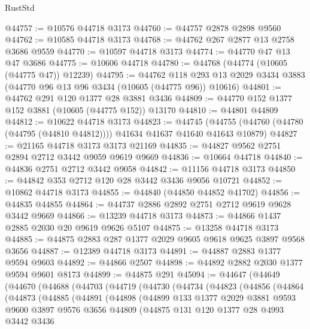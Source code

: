 \begin{lexlean}{RustStd}
\begin{coremodule}
@44757 := @10576 @44718 @3173
@44760 := @44757 @2878 @2898 @9560
@44762 := @10585 @44718 @3173
@44768 := @44762 @267 @2877 @13 @2758 @3686 @9559
@44770 := @10597 @44718 @3173
@44774 := @44770 @47 @13 @47 @3686
@44775 := @10606 @44718
@44780 := @44768 (@44774 (@10605 (@44775 @47)) @12239)
@44795 := @44762
    @118
    @293
    @13
    @2029
    @3434
    @3883
    (@44770 @96 @13 @96 @3434 (@10605 (@44775 @96)) @10616)
@44801 := @44762 @291 @120 @1377 @28 @3881 @3436
@44809 := @44770 @152 @1377 @152 @3881 (@10605 (@44775 @152)) @13170
@44810 := @44801 @44809
@44812 := @10622 @44718 @3173
@44823 := @44745
    (@44755 (@44760 (@44780 (@44795 (@44810 @44812)))) @41634 @41637 @41640 @41643 @10879)
@44827 := @21165 @44718 @3173 @3173 @21169
@44835 := @44827 @9562 @2751 @2894 @2712 @3442 @9059 @9619 @9669
@44836 := @10664 @44718
@44840 := @44836 @2751 @2712 @3442 @9058
@44842 := @11156 @44718 @3173
@44850 := @44842 @353 @2712 @120 @28 @3442 @3436 @9056 @10721
@44852 := @10862 @44718 @3173
@44855 := @44840 (@44850 @44852 @41702)
@44856 := @44835 @44855
@44864 := @44737 @2886 @2892 @2751 @2712 @9619 @9628 @3442 @9669
@44866 := @13239 @44718 @3173
@44873 := @44866 @1437 @2885 @2030 @20 @9619 @9626 @5107
@44875 := @13258 @44718 @3173
@44885 := @44875 @2883 @287 @1377 @2029 @9605 @9618 @9625 @3897 @9568 @3656
@44887 := @12389 @44718 @3173
@44891 := @44887 @2883 @1377 @9594 @9603
@44892 := @44866 @2507
@44898 := @44892 @2882 @2030 @1377 @9594 @9601 @8173
@44899 := @44875 @291
@45094 := @44647
    (@44649
      (@44670
        (@44688
          (@44703
            (@44719
              (@44730
                (@44734
                  (@44823
                    (@44856
                      (@44864
                        (@44873
                          (@44885
                            (@44891
                              (@44898
                                (@44899
                                  @133
                                  @1377
                                  @2029
                                  @3881
                                  @9593
                                  @9600
                                  @3897
                                  @9576
                                  @3656
                                  @44809
                                  (@44875
                                    @131
                                    @120
                                    @1377
                                    @28
                                    @4993
                                    @3442
                                    @3436

\end{coremodule}
\end{lexlean}
